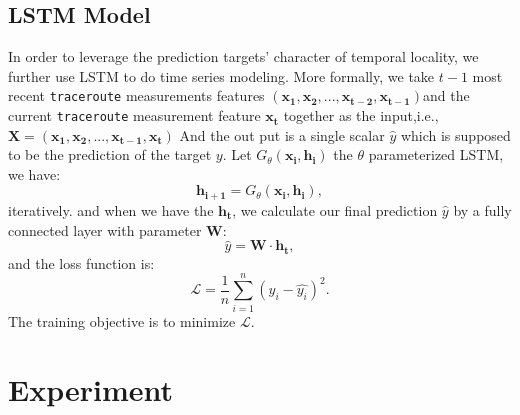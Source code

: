 \documentclass[sigconf]{acmart}
\begin{document}
	\subsection{LSTM Model}
	In order to leverage the prediction targets' character of temporal locality, we further use LSTM to do time series modeling. More formally, we take $t-1$ most recent \texttt{traceroute} measurements features $(\mathbf{x_1},\mathbf{x_2},...,\mathbf{x_{t-2}},\mathbf{x_{t-1}})$and the current \texttt{traceroute} measurement feature $\mathbf{x_t}$ together as the input,i.e.,$\mathbf{X}=(\mathbf{x_1},\mathbf{x_2},...,\mathbf{x_{t-1}},\mathbf{x_{t}})$ And the out put is a single scalar $\hat{y}$ which is supposed to be the prediction of the target $y$.
	Let $G_{\theta}(\mathbf{x_i},\mathbf{h_i})$ the $\theta$ parameterized LSTM, we have:
	\begin{equation}
	\mathbf{h_{i+1}}=G_{\theta}(\mathbf{x_i},\mathbf{h_i}),
	\end{equation}iteratively. and when we have the $\mathbf{h_{t}}$, we calculate our final prediction $\hat{y}$ by a fully connected layer with parameter $\mathbf{W}$:
	\begin{equation}
	\hat{y}=\mathbf{W}\cdot\mathbf{h_t},
	\end{equation}
	and the loss function is:
	\begin{equation}
	\mathcal{L}=\frac{1}{n}\sum_{i=1}^{n}(y_i-\hat{y_i})^2.
	\end{equation}
	The training objective is to minimize $\mathcal{L}$.
	
	
	
	\section{Experiment}
\end{document}
